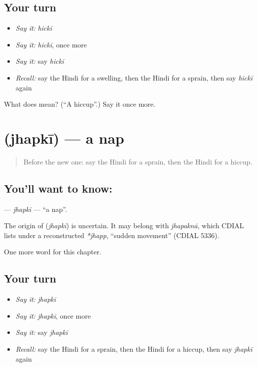 \subsection*{Your turn}
\begin{itemize}
\raggedright
  \item \emph{Say it:} \emph{hickī}
  \item \emph{Say it:} \emph{hickī}, once more
  \item \emph{Say it:} say \emph{hickī}
  \item \emph{Recall:} say the Hindi for a swelling, then the Hindi for a sprain, then say \emph{hickī} again
\end{itemize}

\begin{tcolorbox}[breakable,colback=teal!4,colframe=teal!35!black,title={Before you move on}]
What does  mean? (\textquotedblleft{}A hiccup\textquotedblright{}.) Say it once more.
\end{tcolorbox}
\section[\texorpdfstring{\hi{झपकी} (jhapkī)}{झपकी (jhapkī)}]{ (jhapkī) — a nap}

\label{lesson:HI-C275-jhapki}



\begin{quote}
Before the new one: say the Hindi for a sprain, then the Hindi for a hiccup.
\end{quote}

\subsection*{You'll want to know: }
\textbf{} — \emph{jhapkī} — \textquotedblleft{}a nap\textquotedblright{}.

\begin{cousinweb}
The origin of \textbf{} (\emph{jhapkī}) is uncertain. It may belong with \emph{jhapaknā}, which CDIAL lists under a reconstructed \emph{*jhapp}, \textquotedblleft{}sudden movement\textquotedblright{} (CDIAL 5336).
\end{cousinweb}

\begin{grammarlens}[title={What you've built}]
One more word for this chapter.
\end{grammarlens}

\subsection*{Your turn}
\begin{itemize}
\raggedright
  \item \emph{Say it:} \emph{jhapkī}
  \item \emph{Say it:} \emph{jhapkī}, once more
  \item \emph{Say it:} say \emph{jhapkī}
  \item \emph{Recall:} say the Hindi for a sprain, then the Hindi for a hiccup, then say \emph{jhapkī} again
\end{itemize}

